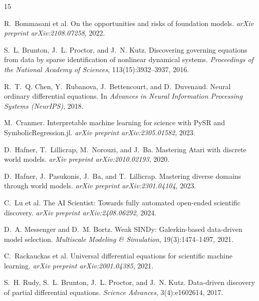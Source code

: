 \documentclass{article}
\begin{document}

\begin{thebibliography}{15}

R.~Bommasani et al.
\newblock On the opportunities and risks of foundation models.
\newblock \emph{arXiv preprint arXiv:2108.07258}, 2022.

S.~L. Brunton, J.~L. Proctor, and J.~N. Kutz.
\newblock Discovering governing equations from data by sparse identification of
  nonlinear dynamical systems.
\newblock \emph{Proceedings of the National Academy of Sciences}, 113(15):3932--3937, 2016.

R.~T.~Q. Chen, Y.~Rubanova, J.~Bettencourt, and D.~Duvenaud.
\newblock Neural ordinary differential equations.
\newblock In \emph{Advances in Neural Information Processing Systems (NeurIPS)}, 2018.

M.~Cranmer.
\newblock Interpretable machine learning for science with PySR and SymbolicRegression.jl.
\newblock \emph{arXiv preprint arXiv:2305.01582}, 2023.

D.~Hafner, T.~Lillicrap, M.~Norouzi, and J.~Ba.
\newblock Mastering Atari with discrete world models.
\newblock \emph{arXiv preprint arXiv:2010.02193}, 2020.

D.~Hafner, J.~Pasukonis, J.~Ba, and T.~Lillicrap.
\newblock Mastering diverse domains through world models.
\newblock \emph{arXiv preprint arXiv:2301.04104}, 2023.

C.~Lu et al.
\newblock The AI Scientist: Towards fully automated open-ended scientific discovery.
\newblock \emph{arXiv preprint arXiv:2408.06292}, 2024.

D.~A. Messenger and D.~M. Bortz.
\newblock Weak SINDy: Galerkin-based data-driven model selection.
\newblock \emph{Multiscale Modeling \& Simulation}, 19(3):1474--1497, 2021.

C.~Rackauckas et al.
\newblock Universal differential equations for scientific machine learning.
\newblock \emph{arXiv preprint arXiv:2001.04385}, 2021.

S.~H. Rudy, S.~L. Brunton, J.~L. Proctor, and J.~N. Kutz.
\newblock Data-driven discovery of partial differential equations.
\newblock \emph{Science Advances}, 3(4):e1602614, 2017.


\end{thebibliography}
\end{document}
